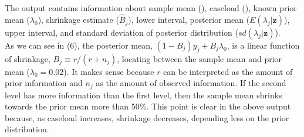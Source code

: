 \documentclass[article]{jss}
\begin{document}
The output contains information about sample mean (), caseload (), known prior mean ($\lambda_{0}$), shrinkage estimate ($\hat{B}_{j}$), lower interval, posterior mean ($E(\lambda_{j}\vert \textbf{z})$), upper interval, and standard deviation of posterior distribution ($sd(\lambda_{j}\vert \textbf{z})$).
\\

As we can see in (6), the posterior mean, $(1-B_{j})y_{j} + B_{j}\lambda_{0}$, is a linear function of shrinkage, $B_{j}\equiv r / (r + n_{j})$, locating between the sample mean and prior mean ($\lambda_{0}=0.02$). It makes sense because $r$ can be interpreted as the amount of prior information and $n_{j}$ as the amount of observed information. If the second level has more information than the first level, then the sample mean shrinks towards the prior mean more than 50\%. This point is clear in the above output because, as caseload increases, shrinkage decreases, depending less on the prior distribution.
\\
\end{document}

